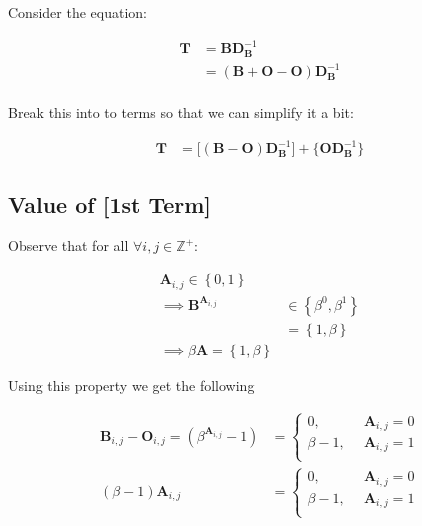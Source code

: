 \documentclass[11pt]{article}
\begin{document}
Consider the equation:


\begin{align*}
\mathbf{T}&= \mathbf{B}\mathbf{D}_{\mathbf{B}}^{- 1} \\
&= \left( \mathbf{B}+  \mathbf{O} - \mathbf{O} \right) \mathbf{D}_{\mathbf{B}}^{- 1} \\
\end{align*}


Break this into to terms so that we can simplify it a bit:


\begin{align*}
    \mathbf{T} &= \Bigg[ \left( \mathbf{B}- \mathbf{O} \right)\mathbf{D}_{\mathbf{B}}^{- 1} \Bigg] + \Bigg\{  \mathbf{O}\mathbf{D}_{\mathbf{B}}^{- 1} \Bigg\}
\end{align*}
\subsection{Value of [1st Term]}
\label{value-of-1st-term}
Observe that for all \(\forall i,j\in \mathbb{Z}^+\):


\begin{align*}
\mathbf{A}_{i, j} \in \left\{0, 1\right\} \\
\implies  \mathbf{B}^{\mathbf{A}_{i, j}} &\in \left\{\beta^0, \beta^1\right\} \\
                     &= \left\{1, \beta \right\}  \\
                      \implies  \beta \mathbf{A} = \left\{1, \beta \right\}
\end{align*}


Using this property we get the following


\begin{align*}
\mathbf{B}_{i,j}- \mathbf{O}_{i,j} = \left( \beta^{\mathbf{A}_{i,j}} -1 \right) &=
\begin{cases}
    0      , &\enspace \mathbf{A}_{i,j}=0  \\
    \beta-1, &\enspace \mathbf{A}_{i,j}=1  \\
\end{cases} \\
\left( \beta- 1 \right) \mathbf{A}_{i,j} &=
\begin{cases}
    0      , &\enspace \mathbf{A}_{i,j}=0  \\
    \beta-1, &\enspace \mathbf{A}_{i,j}=1  \\
\end{cases} \\
\end{align*}
\end{document}
